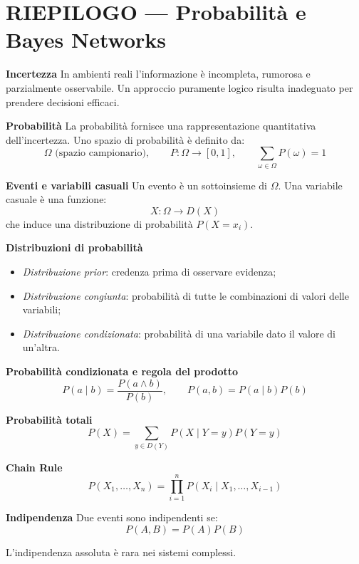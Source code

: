 \documentclass[a4paper,12pt]{report}
\begin{document}
\section*{RIEPILOGO — Probabilità e Bayes Networks}

\begin{tcolorbox}[
    colback=green!10,
    colframe=green!50!black,
    boxrule=0.4pt,
    left=6pt,
    right=6pt,
    top=6pt,
    bottom=6pt,
    breakable
]

\textbf{Incertezza}  
In ambienti reali l’informazione è incompleta, rumorosa e parzialmente osservabile.
Un approccio puramente logico risulta inadeguato per prendere decisioni efficaci.

\medskip
\textbf{Probabilità}  
La probabilità fornisce una rappresentazione quantitativa dell’incertezza.
Uno spazio di probabilità è definito da:
\[
\Omega \text{ (spazio campionario)}, \qquad P : \Omega \rightarrow [0,1], \qquad \sum_{\omega \in \Omega} P(\omega) = 1
\]

\medskip
\textbf{Eventi e variabili casuali}  
Un evento è un sottoinsieme di \( \Omega \).
Una variabile casuale è una funzione:
\[
X : \Omega \rightarrow D(X)
\]
che induce una distribuzione di probabilità \( P(X = x_i) \).

\medskip
\textbf{Distribuzioni di probabilità}  
\begin{itemize}
    \item \textit{Distribuzione prior}: credenza prima di osservare evidenza;
    \item \textit{Distribuzione congiunta}: probabilità di tutte le combinazioni di valori delle variabili;
    \item \textit{Distribuzione condizionata}: probabilità di una variabile dato il valore di un’altra.
\end{itemize}

\medskip
\textbf{Probabilità condizionata e regola del prodotto}
\[
P(a \mid b) = \frac{P(a \land b)}{P(b)}, \qquad
P(a,b) = P(a \mid b)P(b)
\]

\medskip
\textbf{Probabilità totali}
\[
P(X) = \sum_{y \in D(Y)} P(X \mid Y=y) P(Y=y)
\]

\medskip
\textbf{Chain Rule}
\[
P(X_1,\dots,X_n) = \prod_{i=1}^{n} P(X_i \mid X_1,\dots,X_{i-1})
\]

\medskip
\textbf{Indipendenza}  
Due eventi sono indipendenti se:
\[
P(A,B) = P(A)P(B)
\]

L’indipendenza assoluta è rara nei sistemi complessi.


\end{tcolorbox}
\end{document}
